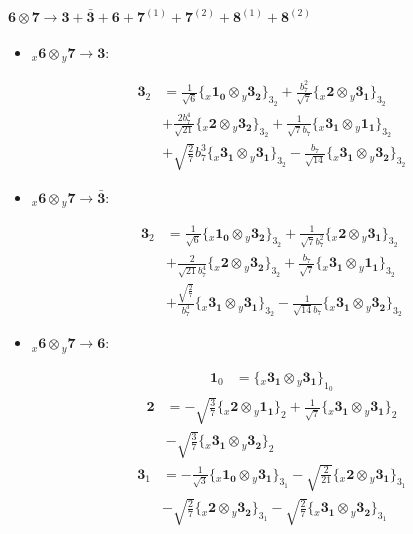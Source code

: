 \documentclass[english]{article}
\newcommand{\cgEqFontsize}{\large}
\newcommand{\rep}[1]{\mathbf{#1}}
\newcommand{\repx}[2]{{}_{#2}\mathbf{#1}}
\newcommand{\tsprod}[2]{\rep{#1}\otimes\rep{#2}}
\newcommand{\tsprodx}[2]{\repx{#1}{x}\otimes\repx{#2}{y}}
\newcommand{\subcgs}[3]{\big\{ \tsprodx{#1}{#2}\big\}^{}_{#3}}
\begin{document}
\paragraph*{\cgEqFontsize $\tsprod{6}{7}\to\rep{3}+\rep{\bar{3}}+\rep{6}+\rep{7}^{(1)}+\rep{7}^{(2)}+\rep{8}^{(1)}+\rep{8}^{(2)}$}
\begin{itemize}
\item $\tsprodx{6}{7}\to\rep{3}$:
\begin{fleqn}
\begin{align*}
\rep{3}_{2} & = \frac{1}{\sqrt{6}}\subcgs{1_{0}}{3_{2}}{3_{2}}+\frac{b_7^2}{\sqrt{7}}\subcgs{2}{3_{1}}{3_{2}} \\ 
 & +\frac{2 b_7^4}{\sqrt{21}}\subcgs{2}{3_{2}}{3_{2}}+\frac{1}{\sqrt{7} b_7}\subcgs{3_{1}}{1_{1}}{3_{2}} \\ 
 & +\sqrt{\frac{2}{7}} b_7^3\subcgs{3_{1}}{3_{1}}{3_{2}}-\frac{b_7}{\sqrt{14}}\subcgs{3_{1}}{3_{2}}{3_{2}}
\end{align*}
\end{fleqn}
\item $\tsprodx{6}{7}\to\rep{\bar{3}}$:
\begin{fleqn}
\begin{align*}
\rep{3}_{2} & = \frac{1}{\sqrt{6}}\subcgs{1_{0}}{3_{2}}{3_{2}}+\frac{1}{\sqrt{7} b_7^2}\subcgs{2}{3_{1}}{3_{2}} \\ 
 & +\frac{2}{\sqrt{21} b_7^4}\subcgs{2}{3_{2}}{3_{2}}+\frac{b_7}{\sqrt{7}}\subcgs{3_{1}}{1_{1}}{3_{2}} \\ 
 & +\frac{\sqrt{\frac{2}{7}}}{b_7^3}\subcgs{3_{1}}{3_{1}}{3_{2}}-\frac{1}{\sqrt{14} b_7}\subcgs{3_{1}}{3_{2}}{3_{2}}
\end{align*}
\end{fleqn}
\item $\tsprodx{6}{7}\to\rep{6}$:
\begin{fleqn}
\begin{align*}
\rep{1}_{0} & = \subcgs{3_{1}}{3_{1}}{1_{0}}
\end{align*}
\begin{align*}
\rep{2} & = -\sqrt{\frac{3}{7}}\subcgs{2}{1_{1}}{2}+\frac{1}{\sqrt{7}}\subcgs{3_{1}}{3_{1}}{2} \\ 
 & -\sqrt{\frac{3}{7}}\subcgs{3_{1}}{3_{2}}{2}
\end{align*}
\begin{align*}
\rep{3}_{1} & = -\frac{1}{\sqrt{3}}\subcgs{1_{0}}{3_{1}}{3_{1}}-\sqrt{\frac{2}{21}}\subcgs{2}{3_{1}}{3_{1}} \\ 
 & -\sqrt{\frac{2}{7}}\subcgs{2}{3_{2}}{3_{1}}-\sqrt{\frac{2}{7}}\subcgs{3_{1}}{3_{2}}{3_{1}}

\end{align*}
\end{fleqn}
\end{itemize}
\end{document}

